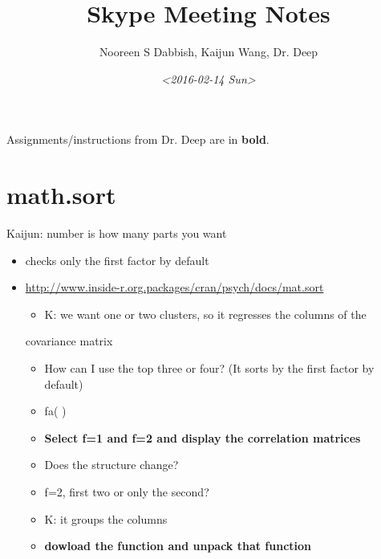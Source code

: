 \documentclass[11pt]{article}
\author{Nooreen S Dabbish, Kaijun Wang, Dr. Deep}
\date{\textit{<2016-02-14 Sun>}}
\title{Skype Meeting Notes}
\begin{document}
\maketitle
Assignments/instructions from Dr. Deep are in \textbf{bold}.

\section{math.sort}
\label{sec-1}

Kaijun: number is how many parts you want
\begin{itemize}
\item checks only the first factor by default
\item \url{http://www.inside-r.org.packages/cran/psych/docs/mat.sort}

\begin{itemize}
\item K: we want one or two clusters, so it regresses the columns of the
\end{itemize}
covariance matrix

\begin{itemize}
\item How can I use the top three or four? (It sorts by the first factor by default)
\item fa( )

\item \textbf{Select f=1 and f=2 and display the correlation matrices}
\item Does the structure change?

\item f=2, first two or only the second?
\item K: it groups the columns

\item \textbf{dowload the function and unpack that function}
\end{itemize}
\end{itemize}
\end{document}
